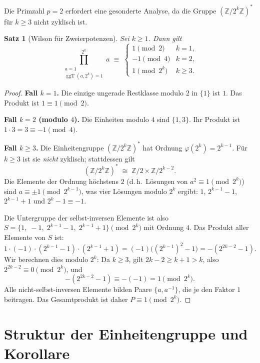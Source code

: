 \documentclass[12pt,a4paper]{amsart}
\newtheorem{theorem}{Satz}[section]
\theoremstyle{definition}
\newcommand{\Z}{\mathbb{Z}}
\DeclareMathOperator{\ggT}{ggT}
\begin{document}
Die Primzahl $p = 2$ erfordert eine gesonderte Analyse, da die Gruppe
$(\Z/2^k\Z)^*$ für $k \geq 3$ nicht zyklisch ist.

\begin{theorem}[Wilson für Zweierpotenzen]\label{satz:wilson_pk_2}
  Sei $k \geq 1$. Dann gilt
  \[
    \prod_{\substack{a=1\\\ggT(a,2^k)=1}}^{2^k} a
    \;\equiv\;
    \begin{cases}
      1  \pmod{2}   & k = 1, \\
      -1 \pmod{4}   & k = 2, \\
      1  \pmod{2^k} & k \geq 3.
    \end{cases}
  \]
\end{theorem}

\begin{proof}
  \textbf{Fall $k = 1$.}
  Die einzige ungerade Restklasse modulo $2$ in $\{1\}$ ist $1$.
  Das Produkt ist $1 \equiv 1 \pmod{2}$.

  \textbf{Fall $k = 2$ (modulo $4$).}
  Die Einheiten modulo $4$ sind $\{1, 3\}$.
  Ihr Produkt ist $1 \cdot 3 = 3 \equiv -1 \pmod{4}$.

  \textbf{Fall $k \geq 3$.}
  Die Einheitengruppe $(\Z/2^k\Z)^*$ hat Ordnung $\varphi(2^k) = 2^{k-1}$.
  Für $k \geq 3$ ist sie \emph{nicht} zyklisch; stattdessen gilt
  \[
    (\Z/2^k\Z)^* \;\cong\; \Z/2 \times \Z/2^{k-2}.
  \]
  Die Elemente der Ordnung höchstens $2$ (d.\,h.\ Lösungen von
  $a^2 \equiv 1 \pmod{2^k}$) sind $a \equiv \pm 1 \pmod{2^{k-1}}$,
  was vier Lösungen modulo $2^k$ ergibt:
  $1$, $2^{k-1}-1$, $2^{k-1}+1$ und $2^k - 1 \equiv -1$.

  Die Untergruppe der selbst-inversen Elemente ist also
  $S = \{1,\; -1,\; 2^{k-1}-1,\; 2^{k-1}+1\} \pmod{2^k}$
  mit Ordnung $4$. Das Produkt aller Elemente von $S$ ist:
  \[
    1 \cdot (-1) \cdot (2^{k-1}-1) \cdot (2^{k-1}+1)
    = (-1)\bigl((2^{k-1})^2 - 1\bigr)
    = -(2^{2k-2} - 1).
  \]
  Wir berechnen dies modulo $2^k$: Da $k \geq 3$, gilt $2k-2 \geq k+1 > k$,
  also $2^{2k-2} \equiv 0 \pmod{2^k}$, und
  \[
    -(2^{2k-2}-1) \equiv -(-1) = 1 \pmod{2^k}.
  \]
  Alle nicht-selbst-inversen Elemente bilden Paare $\{a, a^{-1}\}$, die je
  den Faktor $1$ beitragen. Das Gesamtprodukt ist daher $P \equiv 1 \pmod{2^k}$.
\end{proof}

\section{Struktur der Einheitengruppe und Korollare}
\end{document}
